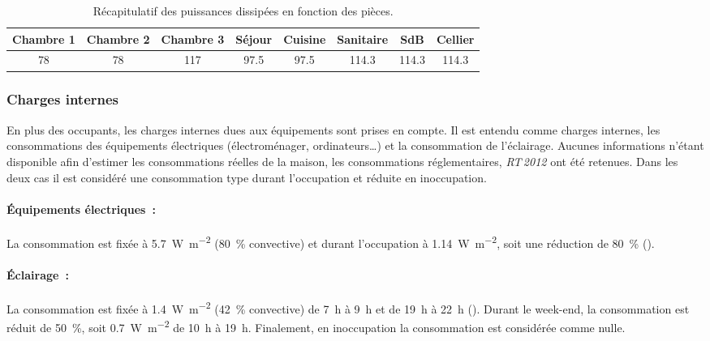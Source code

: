 \begin{table}
\centering
{}
\caption{Récapitulatif des puissances dissipées en fonction des pièces.}
\label{tab:puissance_occupants}
\begin{tabular}{*8{c}}
    \toprule
    Chambre 1 & Chambre 2  & Chambre 3 & Séjour     & Cuisine    & Sanitaire   & SdB         & Cellier     \\
    \midrule
    \num{78}  & \num{78}   & \num{117} & \num{97.5} & \num{97.5} & \num{114.3} & \num{114.3} & \num{114.3} \\
    \bottomrule
\end{tabular}
\end{table}


\subsubsection{Charges internes} %
\label{ssub:charges_internes}
En plus des occupants, les charges internes dues aux équipements sont prises en compte. Il
est entendu comme charges internes, les consommations des équipements électriques
(électroménager, ordinateurs\dots) et la consommation de l’éclairage. Aucunes informations
n’étant disponible afin d’estimer les consommations réelles de la maison, les
consommations réglementaires, \textit{RT\,2012} \parencite{CSTB2011} ont été retenues.
Dans les deux cas il est considéré une consommation type durant l’occupation
et réduite en inoccupation.

\paragraph{Équipements électriques~:} %
\label{par:equipements_electriques}
La consommation est fixée à \SI{5.7}{\watt\per m^{2}} (\SI{80}{\percent}
convective) et durant l’occupation à \SI{1.14}{\watt\per m^{2}}, soit une
réduction de \SI{80}{\percent} ().

\paragraph{Éclairage~:} %
\label{par:eclairage}
La consommation est fixée à \SI{1.4}{\watt\per m^{2}} (\SI{42}{\percent} convective) de
\SI{7}{\hour} à \SI{9}{\hour} et de \SI{19}{\hour} à \SI{22}{\hour}
(). Durant le week-end, la consommation est réduit de
\SI{50}{\percent}, soit \SI{0.7}{\watt\per m^{2}} de \SI{10}{\hour} à \SI{19}{\hour}.
Finalement, en inoccupation la consommation est considérée comme nulle.


